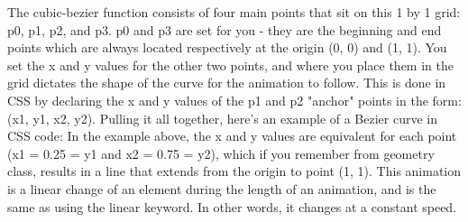 The cubic-bezier function consists of four main points that sit on this 1 by 1 grid: p0, p1, p2, and p3. p0 and p3 are set for you - they are the beginning and end points which are always located respectively at the origin (0, 0) and (1, 1). You set the x and y values for the other two points, and where you place them in the grid dictates the shape of the curve for the animation to follow. This is done in CSS by declaring the x and y values of the p1 and p2 "anchor" points in the form: (x1, y1, x2, y2). Pulling it all together, here's an example of a Bezier curve in CSS code:
In the example above, the x and y values are equivalent for each point (x1 = 0.25 = y1 and x2 = 0.75 = y2), which if you remember from geometry class, results in a line that extends from the origin to point (1, 1). This animation is a linear change of an element during the length of an animation, and is the same as using the linear keyword. In other words, it changes at a constant speed.
